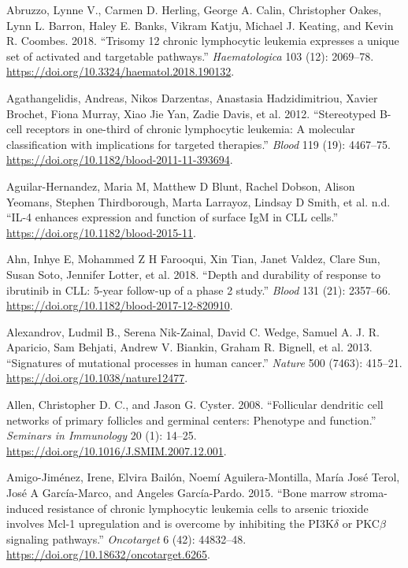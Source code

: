 \documentclass[11pt, a4paper, twosided]{book}
\newenvironment{CSLReferences}%
  {}%
  {\par}
\begin{document}
\hypertarget{refs}{}
\begin{CSLReferences}{1}{0}
\leavevmode{}%
Abruzzo, Lynne V., Carmen D. Herling, George A. Calin, Christopher Oakes, Lynn L. Barron, Haley E. Banks, Vikram Katju, Michael J. Keating, and Kevin R. Coombes. 2018. {``{Trisomy 12 chronic lymphocytic leukemia expresses a unique set of activated and targetable pathways}.''} \emph{Haematologica} 103 (12): 2069--78. \url{https://doi.org/10.3324/haematol.2018.190132}.

\leavevmode{}%
Agathangelidis, Andreas, Nikos Darzentas, Anastasia Hadzidimitriou, Xavier Brochet, Fiona Murray, Xiao Jie Yan, Zadie Davis, et al. 2012. {``{Stereotyped B-cell receptors in one-third of chronic lymphocytic leukemia: A molecular classification with implications for targeted therapies}.''} \emph{Blood} 119 (19): 4467--75. \url{https://doi.org/10.1182/blood-2011-11-393694}.

\leavevmode{}%
Aguilar-Hernandez, Maria M, Matthew D Blunt, Rachel Dobson, Alison Yeomans, Stephen Thirdborough, Marta Larrayoz, Lindsay D Smith, et al. n.d. {``{IL-4 enhances expression and function of surface IgM in CLL cells}.''} \url{https://doi.org/10.1182/blood-2015-11}.

\leavevmode{}%
Ahn, Inhye E, Mohammed Z H Farooqui, Xin Tian, Janet Valdez, Clare Sun, Susan Soto, Jennifer Lotter, et al. 2018. {``{Depth and durability of response to ibrutinib in CLL: 5-year follow-up of a phase 2 study.}''} \emph{Blood} 131 (21): 2357--66. \url{https://doi.org/10.1182/blood-2017-12-820910}.

\leavevmode{}%
Alexandrov, Ludmil B., Serena Nik-Zainal, David C. Wedge, Samuel A. J. R. Aparicio, Sam Behjati, Andrew V. Biankin, Graham R. Bignell, et al. 2013. {``{Signatures of mutational processes in human cancer}.''} \emph{Nature} 500 (7463): 415--21. \url{https://doi.org/10.1038/nature12477}.

\leavevmode{}%
Allen, Christopher D. C., and Jason G. Cyster. 2008. {``{Follicular dendritic cell networks of primary follicles and germinal centers: Phenotype and function}.''} \emph{Seminars in Immunology} 20 (1): 14--25. \url{https://doi.org/10.1016/J.SMIM.2007.12.001}.

\leavevmode{}%
Amigo-Jiménez, Irene, Elvira Bailón, Noemí Aguilera-Montilla, María José Terol, José A García-Marco, and Angeles García-Pardo. 2015. {``{Bone marrow stroma-induced resistance of chronic lymphocytic leukemia cells to arsenic trioxide involves Mcl-1 upregulation and is overcome by inhibiting the PI3K\(\delta\) or PKC\(\beta\) signaling pathways}.''} \emph{Oncotarget} 6 (42): 44832--48. \url{https://doi.org/10.18632/oncotarget.6265}.


\end{CSLReferences}
\end{document}

